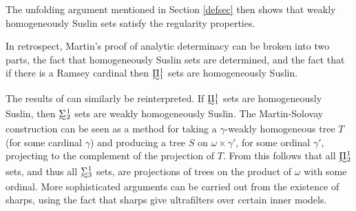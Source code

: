 \documentclass{book}%
\def\underTilde#1{{\baselineskip=0pt\vtop{\hbox{$#1$}\hbox{$\sim$}}}{}}
\newcommand{\uTPi}{\underTilde{\Pi}}
\newcommand{\uTSigma}{\underTilde{\Sigma}}
\begin{document}
The unfolding argument mentioned in Section \ref{defsec} then shows that weakly homogeneously
Suslin sets satisfy the regularity properties.



In retrospect, Martin's proof of analytic determinacy can be
broken into two parts, the fact that homogeneously Suslin sets are
determined, and the fact that if there is a Ramsey cardinal then
$\uTPi^{1}_{1}$ sets are homogeneously Suslin.











The results of \cite{MartinSolovay:1969} can similarly be
reinterpreted. If $\uTPi^{1}_{1}$ sets are homogeneously Suslin,
then $\uTSigma^{1}_{2}$ sets are weakly homogeneously
Suslin.
The Martin-Solovay
construction can be seen as a method for taking a $\gamma$-weakly
homogeneous tree $T$ (for some cardinal $\gamma$) and producing a
tree $S$ on $\omega \times \gamma'$, for some ordinal $\gamma'$, projecting to the complement of the projection of $T$.
From this follows that all $\uTPi^{1}_{2}$ sets, and thus all $\uTSigma^{1}_{3}$ sets,
are projections of trees on the product of $\omega$ with some ordinal. More sophisticated arguments can
be carried out from the existence of sharps, using the fact that sharps give ultrafilters over certain inner models.

\end{document}
